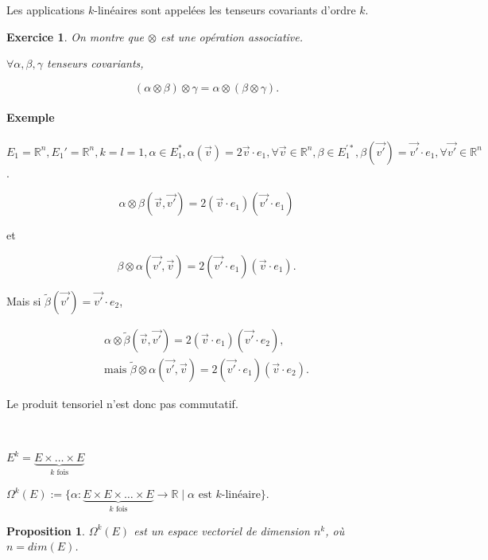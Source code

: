 \documentclass[french]{article}
\newtheorem{prop}{Proposition}[section]
\newtheorem{exo}{Exercice}
\begin{document}
Les applications $k$-linéaires sont appelées les tenseurs covariants d'ordre $k$.

\begin{exo}
  On montre que $\otimes$ est une opération associative.

  $\forall \alpha, \beta, \gamma $ tenseurs covariants,

  \[
  (\alpha \otimes \beta) \otimes \gamma = \alpha \otimes (\beta \otimes \gamma ).
  \]
\end{exo}

\paragraph{Exemple} $E_1 = \mathbb{R}^{n}, E_1' = \mathbb{R} ^{n}, k=l=1, \alpha \in E_1 ^{*}, \alpha(\overrightarrow{ v }) =2 \overrightarrow{ v } \cdot e_1  , \forall \overrightarrow{ v } \in \mathbb{R}^n, \beta \in E_1^{'*}, \beta (\overrightarrow{ v' } ) = \overrightarrow{ v' } \cdot e_1, \forall \overrightarrow{ v' } \in \mathbb{R}^n$.

\[
\alpha \otimes \beta(\overrightarrow{v}, \overrightarrow{ v' }) = 2 (\overrightarrow{ v }\cdot e_1)(\overrightarrow{ v' } \cdot e_1)
\]

et

\[
\beta \otimes \alpha(\overrightarrow{ v' }, \overrightarrow{ v } ) = 2(\overrightarrow{ v' }\cdot e_1 )(\overrightarrow{ v } \cdot e_1 ).
\]

Mais si $\tilde{\beta}(\overrightarrow{ v' } ) = \overrightarrow{ v' } \cdot e_2 $,

\begin{gather*}
  \alpha \otimes \tilde{\beta} (\overrightarrow{ v }, \overrightarrow{ v' }) = 2 (\overrightarrow{ v } \cdot e_1 )(\overrightarrow{ v' }\cdot e_2 ), \\
  \text{mais } \tilde{\beta }\otimes \alpha(\overrightarrow{ v' }, \overrightarrow{ v }  ) = 2 (\overrightarrow{ v' }\cdot e_1 )(\overrightarrow{ v }\cdot e_2 ).
\end{gather*}

Le produit tensoriel n'est donc pas commutatif.

\

$E ^{k} = \underbrace{E \times \dots \times E}_{k \text{ fois} }$

$\Omega ^{k}(E) := \{ \alpha : \underbrace{E \times E \times \dots \times E}_{k \text{ fois} }  \to \mathbb{R} \mid \alpha \text{ est } k \text{-linéaire}  \} $.

\begin{prop}\label{dim-tens}
  $\Omega ^{k}(E)$ est un espace vectoriel de dimension $n ^k$, où $n = dim(E)$.
\end{prop}
\end{document}

